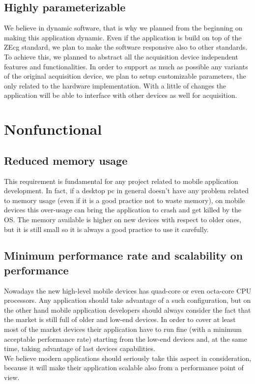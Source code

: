 \subsection{Highly parameterizable}
We believe in dynamic software, that is why we planned from the beginning on making this application dynamic. Even if the application is  build on top of the ZEcg standard, we plan to make the software responsive also to other standards. To achieve this, we planned to abstract all the acquisition device independent features and functionalities. In order to support as much as possible any variants of the original acquisition device, we plan to setup customizable parameters, the only related to the hardware implementation. With a little of changes the application will be able to interface with other devices as well for acquisition.

\section{Nonfunctional}

\subsection{Reduced memory usage}
This requirement is fundamental for any project related to mobile application development. In fact, if a desktop pc in general doesn’t have any problem related to memory usage (even if it is a good practice not to waste memory), on mobile devices this over-usage can bring the application to crash and get killed by the OS. The memory available is higher on new devices with respect to older ones,  but it is still small so it is always a good practice to use it carefully.

\subsection{Minimum performance rate and scalability on performance}
Nowadays the new high-level mobile devices has quad-core or even octa-core CPU processors. Any application should take advantage of a such configuration, but on the other hand mobile application developers should always consider the fact that the market is still full of older and low-end devices. In order to cover at least most of the market devices their application have to run fine (with a minimum acceptable performance rate) starting from the low-end devices and, at the same time, taking advantage of last devices capabilities.\\
We believe modern applications should seriously take this aspect in consideration, because it will make their application scalable also from a performance point of view.


